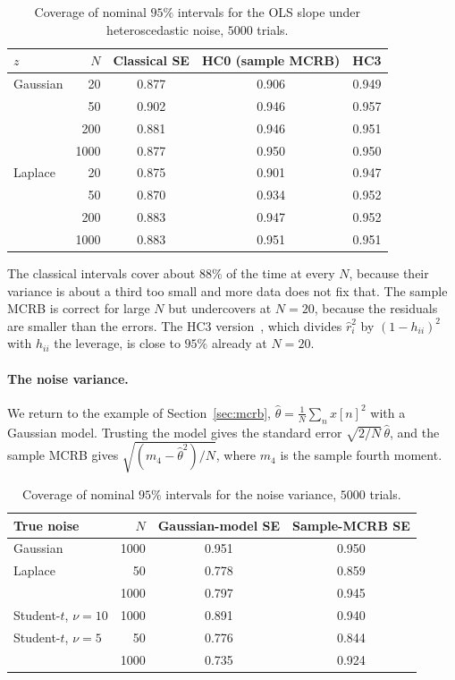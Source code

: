 \documentclass[11pt]{article}
\numberwithin{figure}{section}
\numberwithin{equation}{section}
\begin{document}
\begin{table}[H]
\centering
\begin{tabular}{lrccc}
\toprule
$z$ & $N$ & Classical SE & HC0 (sample MCRB) & HC3 \\
\midrule
Gaussian & 20   & 0.877 & 0.906 & 0.949 \\
         & 50   & 0.902 & 0.946 & 0.957 \\
         & 200  & 0.881 & 0.946 & 0.951 \\
         & 1000 & 0.877 & 0.950 & 0.950 \\
Laplace  & 20   & 0.875 & 0.901 & 0.947 \\
         & 50   & 0.870 & 0.934 & 0.952 \\
         & 200  & 0.883 & 0.947 & 0.952 \\
         & 1000 & 0.883 & 0.951 & 0.951 \\
\bottomrule
\end{tabular}
\caption{Coverage of nominal $95\%$ intervals for the OLS slope under heteroscedastic noise, $5000$ trials.}
\label{tab:simK-het}
\end{table}

The classical intervals cover about $88\%$ of the time at every $N$, because their variance is about a third
too small and more data does not fix that. The sample MCRB is correct for large $N$ but undercovers at
$N = 20$, because the residuals are smaller than the errors. The HC3 version~\cite{mackinnonwhite}, which divides
$\hat r_i^2$ by $(1 - h_{ii})^2$ with $h_{ii}$ the leverage, is close to $95\%$ already at $N = 20$.

\paragraph{The noise variance.} We return to the example of Section~\ref{sec:mcrb}, $\hat\theta = \frac1N\sum_n x[n]^2$
with a Gaussian model. Trusting the model gives the standard error $\sqrt{2/N}\,\hat\theta$, and the sample
MCRB gives $\sqrt{(m_4 - \hat\theta^2)/N}$, where $m_4$ is the sample fourth moment.

\begin{table}[H]
\centering
\begin{tabular}{lrcc}
\toprule
True noise & $N$ & Gaussian-model SE & Sample-MCRB SE \\
\midrule
Gaussian            & 1000 & 0.951 & 0.950 \\
Laplace             & 50   & 0.778 & 0.859 \\
                    & 1000 & 0.797 & 0.945 \\
Student-$t$, $\nu = 10$ & 1000 & 0.891 & 0.940 \\
Student-$t$, $\nu = 5$  & 50   & 0.776 & 0.844 \\
                    & 1000 & 0.735 & 0.924 \\
\bottomrule
\end{tabular}
\caption{Coverage of nominal $95\%$ intervals for the noise variance, $5000$ trials.}
\label{tab:simK-var}
\end{table}
\end{document}
